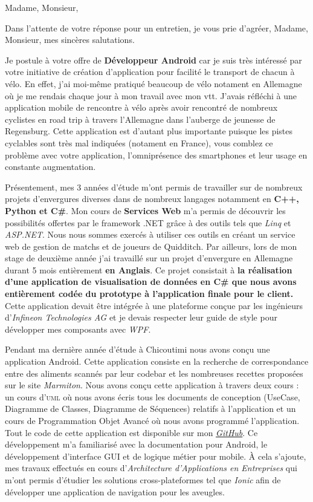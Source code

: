 \date{\today}
\opening{Madame, Monsieur,}
\closing{Dans l'attente de votre réponse pour un entretien, je vous prie d'agréer, Madame, Monsieur, mes sincères salutations.}

\makelettertitle

\introduction{}
Je postule à votre offre de \textbf{Développeur Android} car je suis très intéressé par votre initiative de création d'application pour facilité le transport de chacun à vélo. En effet, j'ai moi-même pratiqué beaucoup de vélo notament en Allemagne où je me rendais chaque jour à mon travail avec mon vtt. J'avais réfléchi à une application mobile de rencontre à vélo après avoir rencontré de nombreux cyclistes en road trip à travers l'Allemagne dans l'auberge de jeunesse de Regensburg. Cette application est d'autant plus importante puisque les pistes cyclables sont très mal indiquées (notament en France), vous comblez ce problème avec votre application, l'omniprésence des smartphones et leur usage en constante augmentation.

Présentement, mes 3 années d'étude m'ont permis de travailler sur de nombreux projets d'envergures diverses dans de nombreux langages notamment en \textbf{C++, Python et C\#}. Mon cours de \textbf{Services Web} m'a permis de découvrir les possibilités offertes par le framework .NET grâce à des outils tels que \textit{Linq} et \textit{ASP.NET}. Nous nous sommes exercés à utiliser ces outils en créant un service web de gestion de matchs et de joueurs de Quidditch. Par ailleurs, lors de mon stage de deuxième année j'ai travaillé sur un projet d'envergure en Allemagne durant 5 mois entièrement \textbf{en Anglais}. Ce projet consistait à \textbf{la réalisation d'une application de visualisation de données en C\# que nous avons entièrement codée du prototype à l'application finale pour le client.} Cette application devait être intégrée à une plateforme conçue par les ingénieurs d'\textit{Infineon Technologies AG} et je devais respecter leur guide de style pour développer mes composants avec \textit{WPF}.

Pendant ma dernière année d'étude à Chicoutimi nous avons conçu une application Android. Cette application consiste en la recherche de correspondance entre des aliments scannés par leur codebar et les nombreuses recettes proposées sur le site \textit{Marmiton}. Nous avons conçu cette application à travers deux cours : un cours d'\textsc{uml} où nous avons écris tous les documents de conception (UseCase, Diagramme de Classes, Diagramme de Séquences) relatifs à l'application et un cours de Programmation Objet Avancé où nous avons programmé l'application. Tout le code de cette application est disponible sur mon \href{https://github.com/vlnk/ShootYourFridge}{\textit{GitHub}}. Ce développement m'a familiarisé avec la documentation pour Android, le développement d'interface GUI et de logique métier pour mobile. À cela s'ajoute, mes travaux effectués en cours d'\textit{Architecture d'Applications en Entreprises} qui m'ont permis d'étudier les solutions cross-plateformes tel que \textit{Ionic} afin de développer une application de navigation pour les aveugles. \conclusion{}

\makeletterclosing
